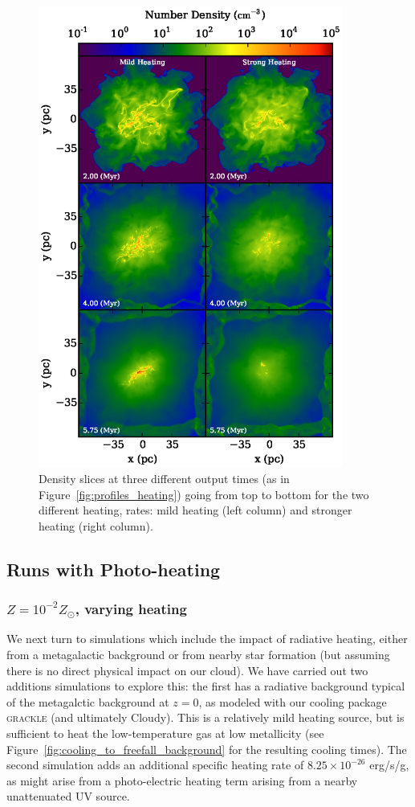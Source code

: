 \documentclass[useAMS,usenatbib]{mn2e}
\begin{document}
\begin{figure}
\begin{center}
\includegraphics[width=10cm]{Images/density_heating_panel}
\end{center}
\caption{\label{fig:density_heating}
Density slices at three different output times (as in Figure~\ref{fig:profiles_heating}) going
from top to bottom for the two different heating, rates: mild heating (left column) and
stronger heating (right column).
}
\end{figure}


\subsection{Runs with Photo-heating}

\subsubsection{$Z=10^{-2}Z_\odot$, varying heating}

We next turn to simulations which include the impact of radiative heating, either from a metagalactic background or from nearby star
formation (but assuming there is no direct physical impact on our cloud).  We have carried out two additions simulations to explore
this: the first has a radiative background typical of the \citet{Haardt2012} metagalctic background at $z=0$, as modeled with our
cooling package \textsc{grackle} (and ultimately Cloudy).  This is a relatively mild heating source, but is sufficient to heat the
low-temperature gas at low metallicity (see Figure~\ref{fig:cooling_to_freefall_background} for the resulting cooling times).
The second simulation adds an additional specific heating rate of $8.25\times10^{-26}$ erg/s/g, as might arise from a photo-electric
heating term arising from a nearby unattenuated UV source.
\end{document}
